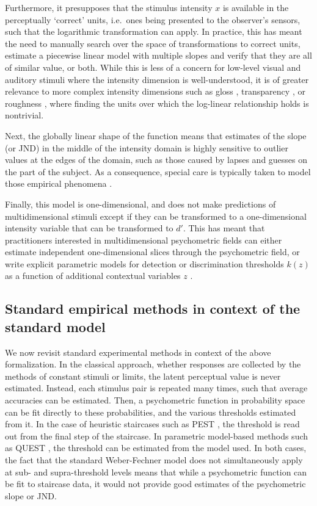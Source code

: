 \documentclass[../main.tex]{subfiles}
\begin{document}
Furthermore, it presupposes that the stimulus intensity $x$ is available in the perceptually `correct' units,
i.e.\ ones being presented to the observer's sensors, such that the logarithmic transformation can apply. In practice, this has meant the need to manually search over the space of transformations to correct units, estimate a piecewise linear model with multiple slopes and verify that they are all of similar value, or both. While this is less of a concern for low-level visual and auditory stimuli where the intensity dimension is well-understood, it is of greater relevance to more complex intensity dimensions such as gloss \citep{Chadwick2015}, transparency \citep{Beck1984}, or roughness \citep{BergmannTiest2007}, where finding the units over which the log-linear relationship holds is nontrivial.

Next, the globally linear shape of the function means that estimates of the slope (or JND) in the middle of the intensity domain is highly sensitive to outlier values at the edges of the domain, such as those caused by lapses and guesses on the part of the subject. As a consequence, special care is typically taken to model those empirical phenomena \citep{Prins2012,Wichmann2001,Linares2016}.

Finally, this model is one-dimensional, and does not make predictions of multidimensional stimuli except if they can be transformed to a one-dimensional intensity variable that can be transformed to $d'$. This has meant that practitioners interested in multidimensional psychometric fields can either estimate independent one-dimensional slices through the psychometric field, or write explicit parametric models for detection or discrimination thresholds $k(z)$ as a function of additional contextual variables $z$ \citep[e.g.][]{Watson2017}.

\subsection{Standard empirical methods in context of the standard model}
We now revisit standard experimental methods in context of the above formalization. In the classical approach, whether responses are collected by the methods of constant stimuli or limits, the latent perceptual value is never estimated. Instead, each stimulus pair is repeated many times, such that average accuracies can be estimated. Then, a psychometric function in probability space can be fit directly to these probabilities, and the various thresholds estimated from it. In the case of heuristic staircases such as PEST \citep{Taylor1967}, the threshold is read out from the final step of the staircase. In parametric model-based methods such as QUEST \citep{Watson1983}, the threshold can be estimated from the model used. In both cases, the fact that the standard Weber-Fechner model does not simultaneously apply at sub- and supra-threshold levels means that while a psychometric function can be fit to staircase data, it would not provide good estimates of the psychometric slope or JND.
\end{document}
